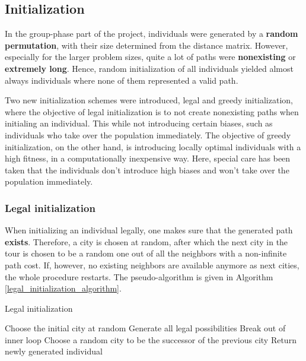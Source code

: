 \documentclass[a4paper,10pt]{article}
\begin{document}
\subsection{Initialization}
\label{initialization}
In the group-phase part of the project, individuals were generated by a \textbf{random permutation}, with their size determined from the distance matrix. However, especially for the larger problem sizes, quite a lot of paths were \textbf{nonexisting} or \textbf{extremely long}. Hence, random initialization of all individuals yielded almost always individuals where none of them represented a valid path. 

Two new initialization schemes were introduced, legal and greedy initialization, where the objective of legal initialization is to not create nonexisting paths when initialing an individual. This while not introducing certain biases, such as individuals who take over the population immediately. The objective of greedy initialization, on the other hand, is introducing locally optimal individuals with a high fitness, in a computationally inexpensive way. Here, special care has been taken that the individuals don't introduce high biases and won't take over the population immediately.

\subsubsection{Legal initialization}
When initializing an individual legally, one makes sure that the generated path \textbf{exists}. Therefore, a city is chosen at random, after which the next city in the tour is chosen to be a random one out of all the neighbors with a non-infinite path cost. If, however, no existing neighbors are available anymore as next cities, the whole procedure restarts. The pseudo-algorithm is given in Algorithm \ref{legal_initialization_algorithm}.

\begin{algorithm}
\caption{Legal initialization}\label{legal_initialization_algorithm}
\begin{algorithmic}
\State Choose the initial city at random
\State Generate all legal possibilities
\State Break out of inner loop
\EndIf
\State Choose a random city to be the successor of the previous city
\EndWhile
{}
\State Return newly generated individual
\EndIf
\EndWhile
\end{algorithmic}
\end{algorithm}
\end{document}
